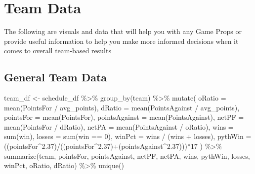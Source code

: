 \documentclass[
]{article}
\newenvironment{Shaded}{\begin{snugshade}}{\end{snugshade}}
\newcommand{\AttributeTok}[1]{\textcolor[rgb]{0.77,0.63,0.00}{#1}}
\newcommand{\DecValTok}[1]{\textcolor[rgb]{0.00,0.00,0.81}{#1}}
\newcommand{\FloatTok}[1]{\textcolor[rgb]{0.00,0.00,0.81}{#1}}
\newcommand{\FunctionTok}[1]{\textcolor[rgb]{0.00,0.00,0.00}{#1}}
\newcommand{\NormalTok}[1]{#1}
\newcommand{\OtherTok}[1]{\textcolor[rgb]{0.56,0.35,0.01}{#1}}
\newcommand{\SpecialCharTok}[1]{\textcolor[rgb]{0.00,0.00,0.00}{#1}}
\begin{document}
\hypertarget{team-data}{%
\section{Team Data}\label{team-data}}

The following are visuals and data that will help you with any Game Props or provide useful information to help you make more informed decisions when it comes to overall team-based results

\hypertarget{general-team-data}{%
\subsection{General Team Data}\label{general-team-data}}

\begin{Shaded}
\begin{Highlighting}[]
\NormalTok{team\_df }\OtherTok{\textless{}{-}}\NormalTok{ schedule\_df }\SpecialCharTok{\%\textgreater{}\%}
  \FunctionTok{group\_by}\NormalTok{(team) }\SpecialCharTok{\%\textgreater{}\%}
  \FunctionTok{mutate}\NormalTok{(}
    \AttributeTok{oRatio =} \FunctionTok{mean}\NormalTok{(PointsFor }\SpecialCharTok{/}\NormalTok{ avg\_points),}
    \AttributeTok{dRatio =} \FunctionTok{mean}\NormalTok{(PointsAgainst }\SpecialCharTok{/}\NormalTok{ avg\_points),}
    \AttributeTok{pointsFor =} \FunctionTok{mean}\NormalTok{(PointsFor),}
    \AttributeTok{pointsAgainst =} \FunctionTok{mean}\NormalTok{(PointsAgainst),}
    \AttributeTok{netPF =} \FunctionTok{mean}\NormalTok{(PointsFor }\SpecialCharTok{/}\NormalTok{ dRatio),}
    \AttributeTok{netPA =} \FunctionTok{mean}\NormalTok{(PointsAgainst }\SpecialCharTok{/}\NormalTok{ oRatio),}
    \AttributeTok{wins =} \FunctionTok{sum}\NormalTok{(win),}
    \AttributeTok{losses =} \FunctionTok{sum}\NormalTok{(win }\SpecialCharTok{==} \DecValTok{0}\NormalTok{),}
    \AttributeTok{winPct =}\NormalTok{ wins }\SpecialCharTok{/}\NormalTok{ (wins }\SpecialCharTok{+}\NormalTok{ losses),}
    \AttributeTok{pythWin =}\NormalTok{ ((pointsFor}\SpecialCharTok{\^{}}\FloatTok{2.37}\NormalTok{)}\SpecialCharTok{/}\NormalTok{((pointsFor}\SpecialCharTok{\^{}}\FloatTok{2.37}\NormalTok{)}\SpecialCharTok{+}\NormalTok{(pointsAgainst}\SpecialCharTok{\^{}}\FloatTok{2.37}\NormalTok{)))}\SpecialCharTok{*}\DecValTok{17}
\NormalTok{  ) }\SpecialCharTok{\%\textgreater{}\%}
  \FunctionTok{summarize}\NormalTok{(team,}
\NormalTok{            pointsFor,}
\NormalTok{            pointsAgainst,}
\NormalTok{            netPF,}
\NormalTok{            netPA,}
\NormalTok{            wins,}
\NormalTok{            pythWin,}
\NormalTok{            losses,}
\NormalTok{            winPct,}
\NormalTok{            oRatio,}
\NormalTok{            dRatio) }\SpecialCharTok{\%\textgreater{}\%}
  \FunctionTok{unique}\NormalTok{()}
\end{Highlighting}
\end{Shaded}
\end{document}
